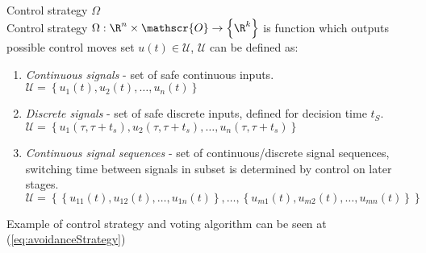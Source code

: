 \begin{definition}{Control strategy $\Omega$}\label{def:controlstrategy}
\\Control strategy $\Omega:\R^n\times\mathscr{O}\to\left\{\R^k\right\}$ is function which outputs possible control moves set $u(t) \in \mathscr{U}$, $\mathscr{U}$ can be defined as:
\begin{enumerate}
    \item \textit{Continuous signals} -  set of safe continuous inputs.
    \\$\mathscr{U} = \left \{ u_1(t),u_2(t),\dots,u_n(t)\right\}$
    \item \textit{Discrete signals} - set of safe discrete inputs, defined for decision time $t_S$.
    \\$\mathscr{U} =  \left\{ u_1(\tau,\tau+t_s),u_2(\tau,\tau+t_s),\dots,u_n(\tau,\tau+t_s)\right\}$
    \item \textit{Continuous signal sequences} - set of continuous/discrete signal sequences, switching time between signals in subset is determined by control on later stages.
    \\$\mathscr{U} = \left\{\left\{u_{11}(t),u_{12}(t),\dots,u_{1n}(t)\right\},\dots,\left\{u_{m1}(t),u_{m2}(t),\dots,u_{mn}(t)\right\}\right\}$
\end{enumerate}
\end{definition}

\begin{note}
    Example of control strategy and voting algorithm can be seen at (\ref{eq:avoidanceStrategy})
\end{note}


